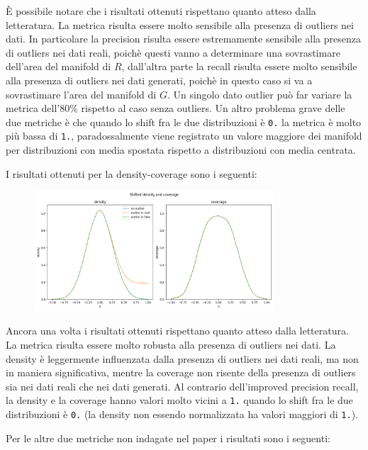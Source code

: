 È possibile notare che i risultati ottenuti rispettano quanto atteso dalla letteratura. La metrica risulta essere molto sensibile alla presenza di outliers nei dati.
In particolare la precision risulta essere estremamente sensibile alla presenza di outliers nei dati reali, poichè questi vanno a determinare una sovrastimare dell'area del manifold di \(R\), dall'altra parte 
la recall risulta essere molto sensibile alla presenza di outliers nei dati generati, poichè in questo caso si va a sovrastimare l'area del manifold di \(G\).
Un singolo dato outlier può far variare la metrica dell'80\% rispetto al caso senza outliers.
Un altro problema grave delle due metriche è che quando lo shift fra le due distribuzioni è \texttt{0.} la metrica è molto più bassa di \texttt{1.}, paradossalmente viene registrato un valore maggiore dei manifold per distribuzioni con media spostata rispetto a distribuzioni con media centrata.

I risultati ottenuti per la density-coverage sono i seguenti:

\begin{figure}[!ht]
    \centering
    \includegraphics[width=0.8\textwidth]{../images/toyexperiments/outliers/shift_density_coverage.png} 
\end{figure}

Ancora una volta i risultati ottenuti rispettano quanto atteso dalla letteratura. La metrica risulta essere molto robusta alla presenza di outliers nei dati.
La density è leggermente influenzata dalla presenza di outliers nei dati reali, ma non in maniera significativa, mentre la coverage non risente della presenza di outliers sia nei dati reali che nei dati generati.
Al contrario dell'improved precision recall, la density e la coverage hanno valori molto vicini a \texttt{1.} quando lo shift fra le due distribuzioni è \texttt{0.} (la density non essendo normalizzata ha valori maggiori di \texttt{1.}).

Per le altre due metriche non indagate nel paper i risultati sono i seguenti:

